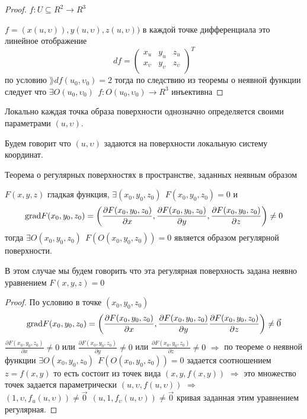 \begin{proof}
  $f: U \subseteq R^2 \to R^3$

  $f = (x(u, \upsilon)), y(u, \upsilon), z(u, \upsilon))$ в каждой точке
  дифференциала это линейное отображение
  $$
  df =
  \left(
  \begin{array}{ccc}
    x_u & y_u & z_u \\
    x_{\upsilon} & y_{\upsilon} & z_{\upsilon} \\
  \end{array}
  \right)^T
  $$
  по условию $\rang df(u_0, \upsilon_0) = 2$ тогда по следствию из теоремы о
  неявной функции следует что $\exists O(u_0, \upsilon_0) ~~
  f: O(u_0, \upsilon_0) \to R^3$ инъективна
\end{proof}

\begin{block}[Следствие]
  Локально каждая точка образа поверхности однозначно определяется своими
  параметрами $(u, \upsilon)$.

  Будем говорит что $(u, \upsilon)$ задаются на поверхности локальную систему
  координат.
\end{block}

\begin{title}[\Large]
  Теорема о регулярных поверхностях в пространстве, заданных неявным образом
\end{title}

\begin{theorem}
  $F(x,y,z)$ гладкая функция, $\exists (x_0, y_0, z_0) ~~ F(x_0, y_0, z_0) = 0$
  и
  $$
  \mathrm{grad} F(x_0, y_0, z_0) = \left(
  \frac{\partial F(x_0, y_0, z_0)}{\partial x},
  \frac{\partial F(x_0, y_0, z_0)}{\partial y},
  \frac{\partial F(x_0, y_0, z_0)}{\partial z}
  \right) \not= 0
  $$
  тогда $\exists O(x_0, y_0, z_0) ~~ F(O(x_0, y_0, z_0)) = 0$ является образом
  регулярной поверхности.

  В этом случае мы будем говорить что эта регулярная поверхность задана
  неявно уравнением $F(x, y, z) = 0$
\end{theorem}

\begin{proof}
  По условию в точке $(x_0, y_0, z_0)$
  $$
  \mathrm{grad} F(x_0, y_0, z_0) = \left( \frac{\partial F(x_0, y_0, z_0)}{\partial x},
  \frac{\partial F(x_0, y_0, z_0)}{\partial y}
  \frac{\partial F(x_0, y_0, z_0)}{\partial z} \right) \not= \vec 0
  $$
  $\frac{\partial F(x_0, y_0, z_0)}{\partial x} \not= 0$ или
  $\frac{\partial F(x_0, y_0, z_0)}{\partial y} \not= 0$ или
  $\frac{\partial F(x_0, y_0, z_0)}{\partial z} \not= 0$ $\Rightarrow$
  по теореме о неявной функции $\exists O(x_0, y_0, z_0) ~~
  F(O(x_0, y_0, z_0)) = 0$ задается соотношением $z = f(x,y)$
  то есть состоит из точек вида $(x, y, f(x, y))$ $\Rightarrow$ это множество
  точек задается параметрически $(u, \upsilon, f(u, \upsilon))$
  $\Rightarrow$ $(1, \upsilon, f_u(u, \upsilon)) \not= \vec 0 ~~
  (u, 1, f_{\upsilon}(u, \upsilon)) \not= \vec 0$ кривая
  заданная этим уравнением регулярная.
\end{proof}